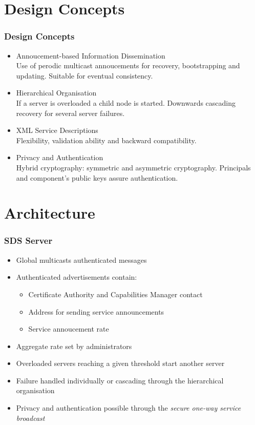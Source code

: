 \documentclass{beamer}
\begin{document}
\section{Design Concepts} 

\begin{frame}
\frametitle{Design Concepts}
\begin{itemize}
\item \alert<+>{Annoucement-based Information Dissemination} \hfill \\
Use of perodic multicast annoucements for recovery, bootstrapping and updating. Suitable for eventual consistency.
\item \alert<+>{Hierarchical Organisation} \hfill \\
If a server is overloaded a child node is started. Downwards cascading recovery for several server failures.
\item \alert<+>{XML Service Descriptions} \hfill \\
Flexibility, validation ability and backward compatibility.
\item \alert<+>{Privacy and Authentication} \hfill \\
Hybrid cryptography: symmetric and asymmetric cryptography. Principals and component's public keys assure authentication.
\end{itemize}
\end{frame}

\section{Architecture}
\begin{frame}
\frametitle{SDS Server}
\begin{itemize}
\item Global multicasts authenticated messages
\item Authenticated advertisements contain:
\begin{itemize}
\item Certificate Authority and Capabilities Manager contact
\item Address for sending service announcements
\item Service annoucement rate
\end{itemize}
\item Aggregate rate set by administrators
\item Overloaded servers reaching a given threshold start another server
\item Failure handled individually or cascading through the hierarchical organisation
\item Privacy and authentication possible through the {\it secure one-way service broadcast}
\end{itemize}
\end{frame}
\end{document}
